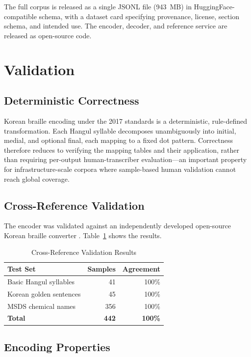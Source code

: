 \documentclass[smallextended]{svjour3}
\begin{document}
The full corpus is released as a single JSONL file (943~MB) in HuggingFace-compatible schema, with a dataset card specifying provenance, license, section schema, and intended use. The encoder, decoder, and reference service are released as open-source code.

\section{Validation}
\label{sec:validation}

\subsection{Deterministic Correctness}

Korean braille encoding under the 2017 standards is a deterministic, rule-defined transformation. Each Hangul syllable decomposes unambiguously into initial, medial, and optional final, each mapping to a fixed dot pattern. Correctness therefore reduces to verifying the mapping tables and their application, rather than requiring per-output human-transcriber evaluation---an important property for infrastructure-scale corpora where sample-based human validation cannot reach global coverage.

\subsection{Cross-Reference Validation}

The encoder was validated against an independently developed open-source Korean braille converter \cite{hangul_braille_converter}. Table~\ref{tab:validation} shows the results.

\begin{table}[H]
\centering
\caption{Cross-Reference Validation Results}
\label{tab:validation}
\begin{tabular}{lrr}
\toprule
Test Set & Samples & Agreement \\
\midrule
Basic Hangul syllables & 41 & 100\% \\
Korean golden sentences & 45 & 100\% \\
MSDS chemical names & 356 & 100\% \\
\midrule
\textbf{Total} & \textbf{442} & \textbf{100\%} \\
\bottomrule
\end{tabular}
\end{table}

\subsection{Encoding Properties}
\end{document}
